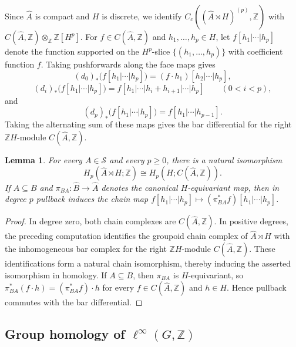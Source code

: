 \documentclass[pdflatex,sn-mathphys-num]{sn-jnl}%
\theoremstyle{plain}
\newtheorem{lemma}[theorem]{Lemma}
\theoremstyle{remark}
\theoremstyle{definition}
\numberwithin{equation}{section}
\begin{document}
Since \( \widehat A \) is compact and \( H \) is discrete, we identify \( C_c((\widehat A\rtimes H)^{(p)},\mathbb Z) \) with \( C(\widehat A,\mathbb Z)\otimes_{\mathbb Z}\mathbb Z[H^p] \). For \( f\in C(\widehat A,\mathbb Z) \) and \( h_1,\ldots,h_p\in H \), let \( f[h_1|\cdots|h_p] \) denote the function supported on the \( H^p \)-slice \( \{(h_1,\ldots,h_p)\} \) with coefficient function \( f \). Taking pushforwards along the face maps gives
\[
(d_0)_*\bigl(f[h_1|\cdots|h_p]\bigr)
=
(f\cdot h_1)[h_2|\cdots|h_p],
\]
\[
(d_i)_*\bigl(f[h_1|\cdots|h_p]\bigr)
=
f[h_1|\cdots|h_i+h_{i+1}|\cdots|h_p]
\qquad
(0<i<p),
\]
and
\[
(d_p)_*\bigl(f[h_1|\cdots|h_p]\bigr)
=
f[h_1|\cdots|h_{p-1}].
\]
Taking the alternating sum of these maps gives the bar differential for the right \( \mathbb Z H \)-module \( C(\widehat A,\mathbb Z) \).

\begin{lemma}
\label{lem:stage-groupoid-group-homology}
For every \( A\in\mathcal S \) and every \( p\geq0 \), there is a natural isomorphism 
\[
H_p(\widehat A\rtimes H;\mathbb Z)
\cong 
H_p(H;C(\widehat A,\mathbb Z)).
\]
If \( A\subseteq B \) and \( \pi_{BA}\colon\widehat B\to\widehat A \) denotes the canonical \( H \)-equivariant map, then in degree \( p \) pullback induces the chain map \( f[h_1|\cdots|h_p]\mapsto(\pi_{BA}^*f)[h_1|\cdots|h_p] \).
\end{lemma}

\begin{proof}
In degree zero, both chain complexes are \( C(\widehat A,\mathbb Z) \). In positive degrees, the preceding computation identifies the groupoid chain complex of \( \widehat A\rtimes H \) with the inhomogeneous bar complex for the right \( \mathbb Z H \)-module \( C(\widehat A,\mathbb Z) \). These identifications form a natural chain isomorphism, thereby inducing the asserted isomorphism in homology. If \( A\subseteq B \), then \( \pi_{BA} \) is \( H \)-equivariant, so \( \pi_{BA}^*(f\cdot h)=(\pi_{BA}^*f)\cdot h \) for every \( f\in C(\widehat A,\mathbb Z) \) and \( h\in H \). Hence pullback commutes with the bar differential.
\end{proof}

\subsection[\texorpdfstring{Group homology of \( \ell^\infty(G,\mathbb Z) \)}{Group homology of ell-infinity(G,Z)}]{Group homology of \( \ell^\infty(G,\mathbb Z) \)}
\label{sec:group-homology-of-ell-infinity(G,Z)}
\end{document}

